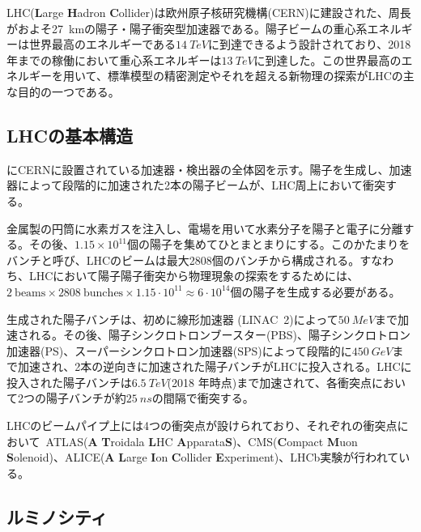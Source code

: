 LHC(\textbf{L}arge \textbf{H}adron \textbf{C}ollider)は欧州原子核研究機構(CERN)に建設された、周長がおよそ27\ \si{km}の陽子・陽子衝突型加速器である。陽子ビームの重心系エネルギーは世界最高のエネルギーである$14\ \si{TeV}$に到達できるよう設計されており、2018年までの稼働において重心系エネルギーは$13\ \si{TeV}$に到達した。この世界最高のエネルギーを用いて、標準模型の精密測定やそれを超える新物理の探索がLHCの主な目的の一つである。

\subsection{LHCの基本構造}
にCERNに設置されている加速器・検出器の全体図を示す。陽子を生成し、加速器によって段階的に加速された2本の陽子ビームが、LHC周上において衝突する。

金属製の円筒に水素ガスを注入し、電場を用いて水素分子を陽子と電子に分離する。その後、$1.15\times 10^{11}$個の陽子を集めてひとまとまりにする。このかたまりをバンチと呼び、LHCのビームは最大2808個のバンチから構成される。すなわち、LHCにおいて陽子陽子衝突から物理現象の探索をするためには、$2\ \mathrm{beams} \times 2808\ \mathrm{bunches}\times 1.15\cdot10^{11}\approx 6\cdot 10^{14}$個の陽子を生成する必要がある。

生成された陽子バンチは、初めに線形加速器 (LINAC\ 2)によって$50\ \si{MeV}$まで加速される。その後、陽子シンクロトロンブースター(PBS)、陽子シンクロトロン加速器(PS)、スーパーシンクロトロン加速器(SPS)によって段階的に$450\ \si{GeV}$まで加速され、2本の逆向きに加速された陽子バンチがLHCに投入される。LHCに投入された陽子バンチは$6.5\ \si{TeV}$(2018 年時点)まで加速されて、各衝突点において2つの陽子バンチが約$25\ \si{ns}$の間隔で衝突する。

LHCのビームパイプ上には4つの衝突点が設けられており、それぞれの衝突点において\ ATLAS(\textbf{A} \textbf{T}roidala \textbf{L}HC \textbf{A}pparata\textbf{S})、CMS(\textbf{C}ompact \textbf{M}uon \textbf{S}olenoid)、ALICE(\textbf{A} \textbf{L}arge \textbf{I}on \textbf{C}ollider \textbf{E}xperiment)、LHCb実験が行われている。


\subsection{ルミノシティ}
\label{sec:luminosity}

